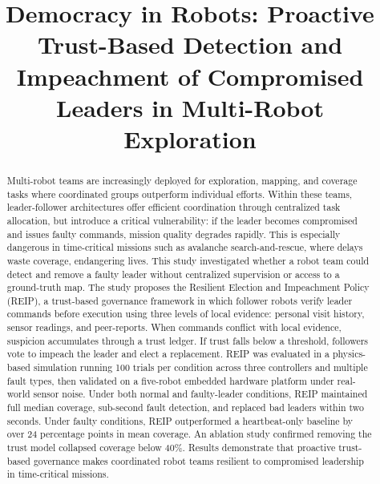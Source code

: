 \documentclass[conference]{IEEEtran}
\begin{document}
\title{Democracy in Robots: Proactive Trust-Based Detection and Impeachment of Compromised Leaders in Multi-Robot Exploration}

\author{
}

\maketitle

\begin{abstract}
Multi-robot teams are increasingly deployed for exploration, mapping, and coverage tasks where coordinated groups outperform individual efforts. Within these teams, leader-follower architectures offer efficient coordination through centralized task allocation, but introduce a critical vulnerability: if the leader becomes compromised and issues faulty commands, mission quality degrades rapidly. This is especially dangerous in time-critical missions such as avalanche search-and-rescue, where delays waste coverage, endangering lives. This study investigated whether a robot team could detect and remove a faulty leader without centralized supervision or access to a ground-truth map.
The study proposes the Resilient Election and Impeachment Policy (REIP), a trust-based governance framework in which follower robots verify leader commands before execution using three levels of local evidence: personal visit history, sensor readings, and peer-reports. When commands conflict with local evidence, suspicion accumulates through a trust ledger. If trust falls below a threshold, followers vote to impeach the leader and elect a replacement. REIP was evaluated in a physics-based simulation running 100 trials per condition across three controllers and multiple fault types, then validated on a five-robot embedded hardware platform under real-world sensor noise.
Under both normal and faulty-leader conditions, REIP maintained full median coverage, sub-second fault detection, and replaced bad leaders within two seconds. Under faulty conditions, REIP outperformed a heartbeat-only baseline by over 24 percentage points in mean coverage. An ablation study confirmed removing the trust model collapsed coverage below 40\%. Results demonstrate that proactive trust-based governance makes coordinated robot teams resilient to compromised leadership in time-critical missions.



\end{abstract}
\end{document}
